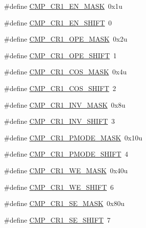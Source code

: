 \begin{DoxyCompactItemize}
\item 
\#define \hyperlink{group___c_m_p___register___masks_ga2492ad39a9661a1217cc26f20bd31ef2}{C\+M\+P\+\_\+\+C\+R1\+\_\+\+E\+N\+\_\+\+M\+A\+SK}~0x1u
\item 
\#define \hyperlink{group___c_m_p___register___masks_gacaacf0894bdf41eb49de1ae81075fa2b}{C\+M\+P\+\_\+\+C\+R1\+\_\+\+E\+N\+\_\+\+S\+H\+I\+FT}~0
\item 
\#define \hyperlink{group___c_m_p___register___masks_gaaad42787753465406dd5006f228049dd}{C\+M\+P\+\_\+\+C\+R1\+\_\+\+O\+P\+E\+\_\+\+M\+A\+SK}~0x2u
\item 
\#define \hyperlink{group___c_m_p___register___masks_ga5c273c5f23e09e69a9589a285cbe2c24}{C\+M\+P\+\_\+\+C\+R1\+\_\+\+O\+P\+E\+\_\+\+S\+H\+I\+FT}~1
\item 
\#define \hyperlink{group___c_m_p___register___masks_gaf8b38740c4bddec386b2b7d674f5f0fc}{C\+M\+P\+\_\+\+C\+R1\+\_\+\+C\+O\+S\+\_\+\+M\+A\+SK}~0x4u
\item 
\#define \hyperlink{group___c_m_p___register___masks_gaaf826df5b4ff2069e2cb112f03c7b782}{C\+M\+P\+\_\+\+C\+R1\+\_\+\+C\+O\+S\+\_\+\+S\+H\+I\+FT}~2
\item 
\#define \hyperlink{group___c_m_p___register___masks_ga562c151a4679c2b50e20d6418dcc7d99}{C\+M\+P\+\_\+\+C\+R1\+\_\+\+I\+N\+V\+\_\+\+M\+A\+SK}~0x8u
\item 
\#define \hyperlink{group___c_m_p___register___masks_gae8bcf6f11eb6afb3967dc6e318b0c41f}{C\+M\+P\+\_\+\+C\+R1\+\_\+\+I\+N\+V\+\_\+\+S\+H\+I\+FT}~3
\item 
\#define \hyperlink{group___c_m_p___register___masks_ga09a2757123048a40e1694dd9454982ee}{C\+M\+P\+\_\+\+C\+R1\+\_\+\+P\+M\+O\+D\+E\+\_\+\+M\+A\+SK}~0x10u
\item 
\#define \hyperlink{group___c_m_p___register___masks_ga35cfe45cce5ed6925e522e3c4527054a}{C\+M\+P\+\_\+\+C\+R1\+\_\+\+P\+M\+O\+D\+E\+\_\+\+S\+H\+I\+FT}~4
\item 
\#define \hyperlink{group___c_m_p___register___masks_ga70bc3069a7e105b59d01d83b4d1714b1}{C\+M\+P\+\_\+\+C\+R1\+\_\+\+W\+E\+\_\+\+M\+A\+SK}~0x40u
\item 
\#define \hyperlink{group___c_m_p___register___masks_ga386bf7ca4f7eb8faa4ba8346620667f2}{C\+M\+P\+\_\+\+C\+R1\+\_\+\+W\+E\+\_\+\+S\+H\+I\+FT}~6
\item 
\#define \hyperlink{group___c_m_p___register___masks_ga899d139651dd67746e73452ff19e892b}{C\+M\+P\+\_\+\+C\+R1\+\_\+\+S\+E\+\_\+\+M\+A\+SK}~0x80u
\item 
\#define \hyperlink{group___c_m_p___register___masks_ga57cd3f81d8844d4e0509f342ae5170bb}{C\+M\+P\+\_\+\+C\+R1\+\_\+\+S\+E\+\_\+\+S\+H\+I\+FT}~7

\end{DoxyCompactItemize}
